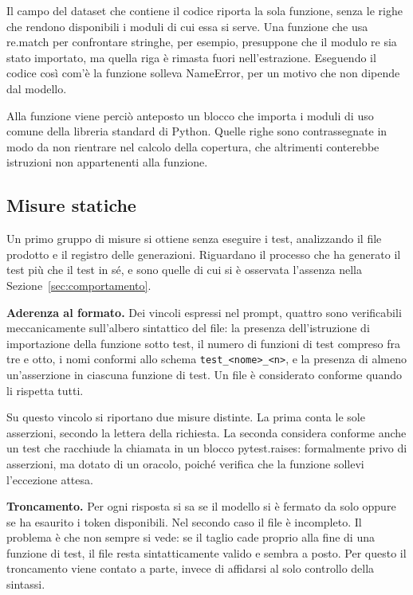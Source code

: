 Il campo del dataset che contiene il codice riporta la sola funzione, senza le righe che rendono disponibili i moduli di cui essa si serve. Una funzione che usa re.match per confrontare stringhe, per esempio, presuppone che il modulo re sia stato importato, ma quella riga è rimasta fuori nell'estrazione. Eseguendo il codice così com'è la funzione solleva NameError, per un motivo che non dipende dal modello.

Alla funzione viene perciò anteposto un blocco che importa i moduli di uso comune della libreria standard di Python. Quelle righe sono contrassegnate in modo da non rientrare nel calcolo della copertura, che altrimenti conterebbe istruzioni non appartenenti alla funzione.

\subsection{Misure statiche}
\label{sec:statiche}
Un primo gruppo di misure si ottiene senza eseguire i test, analizzando il file
prodotto e il registro delle generazioni. Riguardano il processo che ha generato
il test più che il test in sé, e sono quelle di cui si è osservata l'assenza
nella Sezione~\ref{sec:comportamento}.

\textbf{Aderenza al formato.} Dei vincoli espressi nel prompt, quattro sono
verificabili meccanicamente sull'albero sintattico del file: la presenza
dell'istruzione di importazione della funzione sotto test, il numero di funzioni
di test compreso fra tre e otto, i nomi conformi allo schema
\texttt{test\_<nome>\_<n>}, e la presenza di almeno un'asserzione in ciascuna
funzione di test. Un file è considerato conforme quando li rispetta tutti.

Su questo vincolo si riportano due misure distinte. La prima conta le sole asserzioni, secondo la lettera della richiesta. La seconda considera conforme anche un test che racchiude la chiamata in un blocco pytest.raises: formalmente privo di asserzioni, ma dotato di un oracolo, poiché verifica che la funzione sollevi l'eccezione attesa.

\textbf{Troncamento.} Per ogni risposta si sa se il modello si è fermato da solo
oppure se ha esaurito i token disponibili. Nel secondo caso il file è incompleto. Il problema è che non sempre si vede: se il taglio cade proprio alla fine di una funzione di test, il file resta sintatticamente valido e sembra a posto. Per questo il troncamento viene contato a parte, invece di affidarsi al solo controllo della sintassi.

